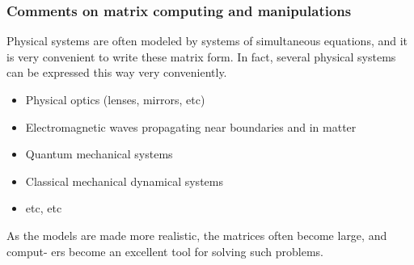 \documentclass[hyperref={colorlinks=true}]{beamer}
\begin{document}

\begin{frame}%
  \frametitle{Comments on matrix computing and manipulations}

  Physical systems are often modeled by systems of simultaneous equations, and it is very convenient to write these matrix form. In fact, several physical systems can be expressed this way very conveniently.
  
  \vspace{0.3cm}
  
  \begin{itemize}
    \item Physical optics (lenses, mirrors, etc)
    \item Electromagnetic waves propagating near boundaries and in matter
    \item Quantum mechanical systems
    \item Classical mechanical dynamical systems
    \item etc, etc
  \end{itemize}
  
  As the models are made more realistic, the matrices often become large, and comput- ers become an excellent tool for solving such problems.

\end{frame}

\end{document}
